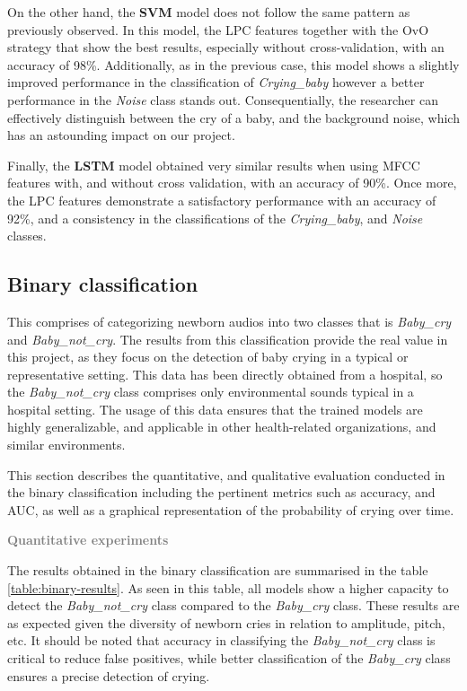 On the other hand, the \textbf{SVM} model does not follow the same pattern as previously observed. In this model, the LPC features together with the OvO strategy that show the best results, especially without cross-validation, with an accuracy of 98\%. Additionally, as in the previous case, this model shows a slightly improved performance in the classification of \textit{Crying\_baby} however a better performance in the \textit{Noise} class stands out. Consequentially, the researcher can effectively distinguish between the cry of a baby, and the background noise, which has an astounding impact on our project. 

Finally, the \textbf{LSTM} model obtained very similar results when using MFCC features with, and without cross validation, with an accuracy of 90\%. Once more, the LPC features demonstrate a satisfactory performance with an accuracy of 92\%, and a consistency in the classifications of the \textit{Crying\_baby}, and \textit{Noise} classes.


\subsection{Binary classification}
This comprises of categorizing newborn audios into two classes that is \textit{Baby\_cry} and \textit{Baby\_not\_cry}. The results from this classification provide the real value in this project, as they focus on the detection of baby crying in a typical or representative setting. This data has been directly obtained from a hospital, so the \textit{Baby\_not\_cry} class comprises only environmental sounds typical in a hospital setting. The usage of this data ensures that the trained models are highly generalizable, and applicable in other health-related organizations, and similar environments.

This section describes the quantitative, and qualitative evaluation conducted in the binary classification including the pertinent metrics such as accuracy, and AUC, as well as a graphical representation of the probability of crying over time.

\vspace{\baselineskip}
{\fontsize{16pt}{16pt}\textcolor{gray}{\textbf{Quantitative experiments }}}

The results obtained in the binary classification are summarised in the table \ref{table:binary-results}. As seen in this table, all models show a higher capacity to detect the \textit{Baby\_not\_cry} class compared to the \textit{Baby\_cry} class. These results are as expected given the diversity of newborn cries in relation to amplitude, pitch, etc. It should be noted that accuracy in classifying the \textit{Baby\_not\_cry} class is critical to reduce false positives, while better classification of the \textit{Baby\_cry} class ensures a precise detection of crying.

